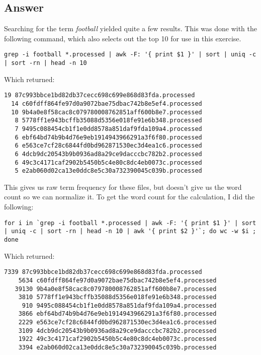 \documentclass[letterpaper,11pt]{article}
\begin{document}
\newpage
\subsection*{Answer}

Searching for the term \emph{football} yielded quite a few results.  This was done with the following command, which also selects out the top 10 for use in this exercise.

\begin{lstlisting}[frame=single]
grep -i football *.processed | awk -F: '{ print $1 }' | sort | uniq -c | sort -rn | head -n 10
\end{lstlisting}

Which returned:
\begin{lstlisting}[frame=single]
  19 87c993bbce1bd82db37cecc698c699e868d83fda.processed
  14 c60fdff864fe97d0a9072bae75dbac742b8e5ef4.processed
  10 9b4a0e8f58cac8c079780008762851aff600b8e7.processed
   8 5778ff1e943bcffb35088d5356e018fe91e6b348.processed
   7 9495c088454cb1f1e0dd8578a851daf9fda109a4.processed
   6 ebf64bd74b9b4d76e9eb1914943966291a3f6f80.processed
   6 e563ce7cf28c6844fd0bd962871530ec3d4ea1c6.processed
   6 4dcb9dc20543b9b0936ad8a29ce9dacccbc782b2.processed
   6 49c3c4171caf2902b5450b5c4e80c8dc4eb0073c.processed
   5 e2ab060d02ca13e0ddc8e5c30a732390045c039b.processed
\end{lstlisting}

This gives us raw term frequency for these files, but doesn't give us the word count so we can normalize it.  To get the word count for the calculation, I did the following:
\begin{lstlisting}[frame=single]
for i in `grep -i football *.processed | awk -F: '{ print $1 }' | sort | uniq -c | sort -rn | head -n 10 | awk '{ print $2 }'`; do wc -w $i ; done
\end{lstlisting}

Which returned:
\begin{lstlisting}[frame=single]
    7339 87c993bbce1bd82db37cecc698c699e868d83fda.processed
    5634 c60fdff864fe97d0a9072bae75dbac742b8e5ef4.processed
   39130 9b4a0e8f58cac8c079780008762851aff600b8e7.processed
    3810 5778ff1e943bcffb35088d5356e018fe91e6b348.processed
     910 9495c088454cb1f1e0dd8578a851daf9fda109a4.processed
    3866 ebf64bd74b9b4d76e9eb1914943966291a3f6f80.processed
    2229 e563ce7cf28c6844fd0bd962871530ec3d4ea1c6.processed
    3109 4dcb9dc20543b9b0936ad8a29ce9dacccbc782b2.processed
    1922 49c3c4171caf2902b5450b5c4e80c8dc4eb0073c.processed
    3394 e2ab060d02ca13e0ddc8e5c30a732390045c039b.processed
\end{lstlisting}
\end{document}
